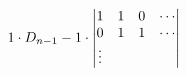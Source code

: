 \documentclass[preview]{standalone}
\begin{document}
\begin{align*}
\special{dvisvgm:raw <g id='unique000'>}1\cdot D_{n-1}-1\cdot\begin{vmatrix}1&1&0&\cdots\\0&1&1&\cdots\\\vdots\end{vmatrix}\special{dvisvgm:raw </g>}
\end{align*}
\end{document}

